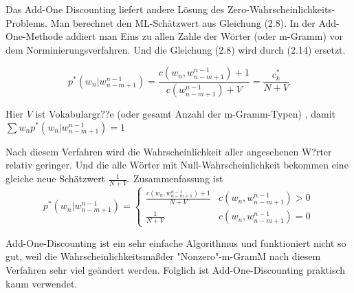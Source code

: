 Das Add-One Discounting liefert andere L\"osung des Zero-Wahrscheinlichkeits-Problems. Man berechnet den ML-Sch\"atzwert aus Gleichung (2.8). In der Add-One-Methode addiert man Eins zu allen Zahle der W\"orter (oder m-Gramm) vor dem Norminierungsverfahren.  Und die Gleichung (2.8) wird durch (2.14) ersetzt.

\begin{equation}
\label{equation:add_one_01}
p^{*}(w_{n}|w_{n-m+1}^{n-1})=\frac{c(w_{n},w_{n-m+1}^{n-1})+1}{c(w_{n-m+1}^{n-1})+V}=\frac{c_{k}^{*}}{N+V}
\end{equation}

Hier $V$ ist Vokabulargr??e (oder gesamt Anzahl der m-Gramm-Typen) , damit \\ 
$\sum{w_{n}}p^{*}(w_{n}|w_{n-m+1}^{n-1})=1$

Nach diesem Verfahren wird die Wahrscheinlichkeit aller angesehenen W?rter relativ geringer. Und die alle W\"orter mit Null-Wahrscheinlichkeit bekommen eine gleiche neue Sch\"atzwert $\frac{1}{N+V}$. Zusammenfassung ist
\begin{equation}
p^{*}(w_{n}|w_{n-m+1}^{n-1})=\begin{cases}
\frac{c(w_{n},w_{n-m+1}^{n-1})+1}{N+V} & c(w_{n},w_{n-m+1}^{n-1})>0 \\
\frac{1}{N+V} & c(w_{n},w_{n-m+1}^{n-1})=0 
\end{cases}
\end{equation}

Add-One-Discounting ist ein sehr einfache Algorithmus und funktioniert nicht so gut, weil die Wahrscheinlichkeitsma\ss der "Nonzero"-m-GramM nach diesem Verfahren sehr viel ge\"andert werden\cite{book_speech}. Folglich ist Add-One-Discounting  praktisch kaum verwendet.